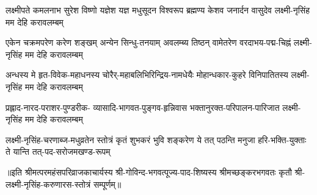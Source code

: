 \fourlineindentedshloka
{लक्ष्मीपते कमलनाभ सुरेश विष्णो}
{यज्ञेश यज्ञ मधुसूदन विश्वरूप}
{ब्रह्मण्य केशव जनार्दन वासुदेव}
{लक्ष्मी-नृसिंह मम देहि करावलम्बम्}

\fourlineindentedshloka
{एकेन चक्रमपरेण करेण शङ्खम्}
{अन्येन सिन्धु-तनयाम् अवलम्ब्य तिष्ठन्}
{वामेतरेण वरदाभय-पद्म-चिह्नं}
{लक्ष्मी-नृसिंह मम देहि करावलम्बम्}

\fourlineindentedshloka
{अन्धस्य मे हृत-विवेक-महाधनस्य}
{चोरैर्-महाबलिभिरिन्द्रिय-नामधेयैः}
{मोहान्धकार-कुहरे विनिपातितस्य}
{लक्ष्मी-नृसिंह मम देहि करावलम्बम्}

\fourlineindentedshloka
{प्रह्लाद-नारद-पराशर-पुण्डरीक-}
{व्यासादि-भागवत-पुङ्गव-हृन्निवास}
{भक्तानुरक्त-परिपालन-पारिजात}
{लक्ष्मी-नृसिंह मम देहि करावलम्बम्}

\fourlineindentedshloka
{लक्ष्मी-नृसिंह-चरणाब्ज-मधुव्रतेन}
{स्तोत्रं कृतं शुभकरं भुवि शङ्करेण}
{ये तत् पठन्ति मनुजा हरि-भक्ति-युक्ताः}
{ते यान्ति तत्-पद-सरोजमखण्ड-रूपम्}


॥इति श्रीमत्परमहंसपरिव्राजकाचार्यस्य श्री-गोविन्द-भगवत्पूज्य-पाद-शिष्यस्य
श्रीमच्छङ्करभगवतः कृतौ श्री-लक्ष्मी-नृसिंह-करुणारस-स्तोत्रं सम्पूर्णम्‌॥
